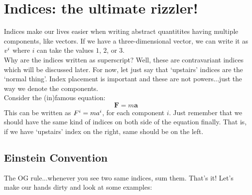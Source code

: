 \section{Indices: the ultimate rizzler!}
Indices make our lives easier when writing abstract quantitites having multiple components, like vectors. If we have a three-dimensional vector, we can write it as $v\indices{^i}$ where $i$ can take the values $1$, $2$, or $3$.\\[0.3cm]
 Why are the indices written as superscript? Well, these are contravariant indices which will be discussed later. For now, let just say that `upstairs' indices are the `normal thing'. Index placement is important and these are not powers...just the way we denote the components.\\[0.3cm]
 Consider the (in)famous equation: 
 $$\mathbf{F}= m \mathbf{a}$$
 This can be written as $F\indices{^i} = m a\indices{^i}$, for each component $i$. Just remember that we should have the same kind of indices on both side of the equation finally. That is, if we have `upstairs' index on the right, same should be on the left.\\[0.3cm]
 \subsection{Einstein Convention}
 The OG rule...whenever you see two same indices, sum them.  That's it! Let's make our hands dirty and look at some examples:\\[0.3cm]
